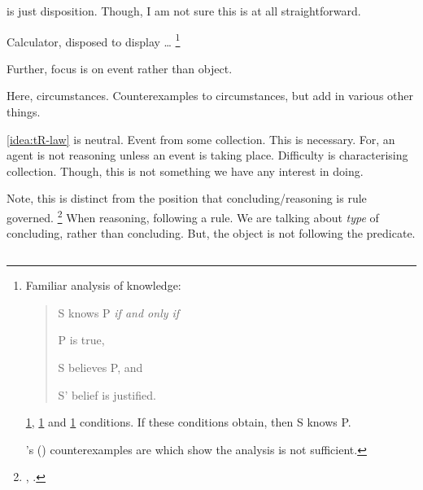 \begin{note}
  \tC{} is just disposition.
  Though, I am not sure this is at all straightforward.

  Calculator, disposed to display \dots%
  \footnote{
    Familiar analysis of knowledge:

    \begin{quote}
      S knows P \emph{if and only if}
      \begin{enumerate*}[label=\roman*., ref=(\roman*)]
      \item
        \label{K:jtb:t}
        P is true,
      \item
        \label{K:jtb:b}
        S believes P, and
      \item
        \label{K:jtb:j}
        S' belief is justified.
      \end{enumerate*}%
    \end{quote}

    \ref{K:jtb:t}, \ref{K:jtb:b} and \ref{K:jtb:j} conditions.
    If these conditions obtain, then S knows P.

    \citeauthor{Gettier:1963aa}'s (\citeyear{Gettier:1963aa}) counterexamples are  which show the analysis is not sufficient.
  }

  Further, focus is on event rather than object.
\end{note}

\begin{note}
  Here, circumstances.
  Counterexamples to circumstances, but add in various other things.

  \autoref{idea:tR-law} is neutral.
  Event from some collection.
  This is necessary.
  For, an agent is not reasoning unless an event is taking place.
  Difficulty is characterising collection.
  Though, this is not something we have any interest in doing.
\end{note}

\begin{note}
  Note, this is distinct from the position that concluding/reasoning is rule governed.%
  \footnote{
    \cite{Boghossian:2008vf,Boghossian:2012vb}, \cite{Broome:2002aa}.
  }
  When reasoning, following a rule.
  We are talking about \emph{type} of concluding, rather than concluding.
  But, the object is not following the predicate.
\end{note}

\subsection{}
\label{sec:illu3-1}

